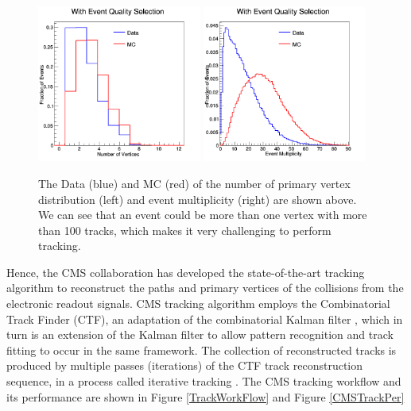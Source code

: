 \begin{figure}[hbtp]
\begin{center}
\includegraphics[width=0.48\textwidth]{Figures/Chapter4/Vertex.png}
\includegraphics[width=0.48\textwidth]{Figures/Chapter4/Multiplicity.png}
\caption{The Data (blue) and MC (red) of the number of primary vertex distribution (left) and event multiplicity (right) are shown above. We can see that an event could be more than one vertex with more than 100 tracks, which makes it very challenging to perform tracking.}
\label{CMSEvtInfo}
\end{center}
\end{figure} 

Hence, the CMS collaboration has developed the state-of-the-art tracking algorithm to reconstruct the paths and primary vertices of the collisions from the electronic readout signals. CMS tracking algorithm employs the Combinatorial Track Finder (CTF), an adaptation of the combinatorial Kalman filter \cite{CMSTrack1,CMSTrack2,CMSTrack3}, which in turn is an extension of the Kalman filter \cite{Kalman} to allow pattern recognition and track fitting to occur in the same framework. The collection of reconstructed tracks is produced by multiple passes (iterations) of the CTF track reconstruction sequence, in a process called iterative tracking \cite{CMSTrackComp}. The CMS tracking workflow and its performance are shown in Figure \ref{TrackWorkFlow} and Figure \ref{CMSTrackPer}



